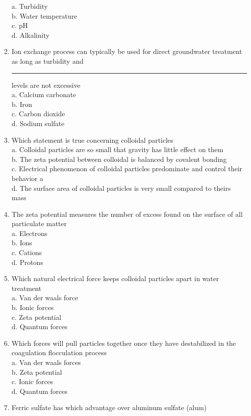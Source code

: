 \begin{enumerate}
a.  Turbidity\\
b.  Water temperature\\
c.  pH \\
d.  Alkalinity\\
\item Ion exchange process can typically be used for direct groundwater treatment as long as turbidity and \rule{1.5cm}{0.5pt} levels are not excessive\\
a.  Calcium carbonate\\
b.  Iron\\
c.  Carbon dioxide\\
d.  Sodium sulfate\\
\item Which statement is true concerning colloidal particles\\
a.  Colloidal particles are so small that gravity has little effect on them\\
b.  The zeta potential between colloidal is balanced by covalent bonding\\
c.  Electrical phenomenon of colloidal particles predominate and control their behavior a\\
d.  The surface area of colloidal particles is very small compared to theirs mass\\
\item The zeta potential measures the number of excess found on the surface of all particulate matter\\
a.  Electrons\\
b.  Ions\\
c.  Cations\\
d.  Protons\\
\item Which natural electrical force keeps colloidal particles apart in water treatment\\
a.  Van der waals force\\
b.  Ionic forces\\
c.  Zeta potential\\
d.  Quantum forces\\
\item Which forces will pull particles together once they have destabilized in the coagulation flocculation process\\
a.  Van der waals forces\\
b.  Zeta potential\\
c.  Ionic forces\\
d.  Quantum forces\\
\item Ferric sulfate has which advantage over aluminum sulfate (alum)\\

\end{enumerate}
